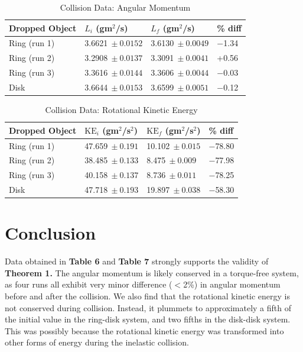 \begin{table}[!htb]
	\centering
	\begin{tabular}{@{}llll@{}}
		\toprule
		Dropped Object & $L_i$ (gm$^2$/s) & $L_f$ (gm$^2$/s) & \% diff \\ \midrule
		\multicolumn{1}{l|}{Ring (run 1)} & \multicolumn{1}{l|}{3.6621$\ \pm0.0152$} & \multicolumn{1}{l|}{3.6130$\ \pm0.0049$} & $-$1.34 \\
		\multicolumn{1}{l|}{Ring (run 2)} & \multicolumn{1}{l|}{3.2908$\ \pm0.0137$} & \multicolumn{1}{l|}{3.3091$\ \pm0.0041$} & +0.56 \\
		\multicolumn{1}{l|}{Ring (run 3)} & \multicolumn{1}{l|}{3.3616$\ \pm0.0144$} & \multicolumn{1}{l|}{3.3606$\ \pm0.0044$} & $-$0.03 \\
		\multicolumn{1}{l|}{Disk} & \multicolumn{1}{l|}{3.6644$\ \pm0.0153$} & \multicolumn{1}{l|}{3.6599$\ \pm0.0051$} & $-$0.12 \\ \cmidrule(r){1-4}
	\end{tabular}
\caption{Collision Data: Angular Momentum}
\end{table}

\begin{table}[!htb]
	\centering
	\begin{tabular}{@{}llll@{}}
		\toprule
		Dropped Object & $\text{KE}_i$ (gm$^2$/s$^2$) & $\text{KE}_f$ (gm$^2$/s$^2$) & \% diff \\ \midrule
		\multicolumn{1}{l|}{Ring (run 1)} & \multicolumn{1}{l|}{47.659$\ \pm0.191$} & \multicolumn{1}{l|}{10.102$\ \pm0.015$} & $-$78.80\\
		\multicolumn{1}{l|}{Ring (run 2)} & \multicolumn{1}{l|}{38.485$\ \pm0.133$} & \multicolumn{1}{l|}{8.475$\ \pm0.009$} & $-$77.98 \\
		\multicolumn{1}{l|}{Ring (run 3)} & \multicolumn{1}{l|}{40.158$\ \pm0.137$} & \multicolumn{1}{l|}{8.736$\ \pm0.011$} & $-$78.25 \\
		\multicolumn{1}{l|}{Disk} & \multicolumn{1}{l|}{47.718$\ \pm0.193$} & \multicolumn{1}{l|}{19.897$\ \pm0.038$} & $-$58.30 \\ \bottomrule
	\end{tabular}
\caption{Collision Data: Rotational Kinetic Energy}
\end{table}
\section{Conclusion}
Data obtained in \textbf{Table 6} and \textbf{Table 7} strongly supports the validity of \textbf{Theorem 1.} The angular momentum is likely conserved in a torque-free system, as four runs all exhibit very minor difference ($<$2\%) in angular momentum before and after the collision. We also find that the rotational kinetic energy is not conserved during collision. Instead, it plummets to approximately a fifth of the initial value in the ring-disk system, and two fifths in the disk-disk system. This was possibly because the rotational kinetic energy was transformed into other forms of energy during the inelastic collision.

